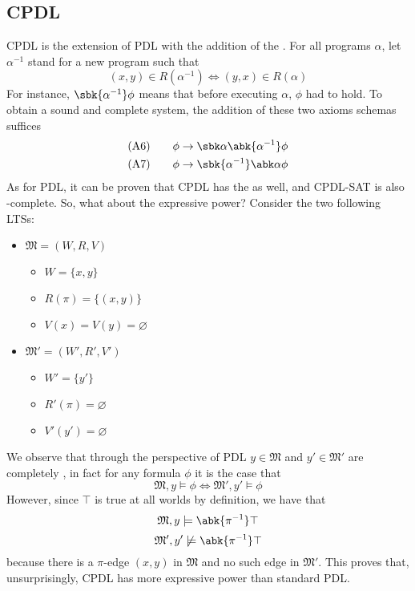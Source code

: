 \documentclass[a4paper, 12pt]{report}
\begin{document}
    \subsection{CPDL}

    CPDL is the extension of PDL with the addition of the . For all programs $\alpha$, let $\alpha^{-1}$ stand for a new program such that $$(x, y) \in R(\alpha^{-1}) \iff (y, x) \in R(\alpha)$$ For instance, $\sbk{\alpha ^{-1}}\phi$ means that before executing $\alpha$, $\phi$ had to hold. To obtain a sound and complete system, the addition of these two axioms schemas suffices
    \begin{equation*}
        \begin{alignedat}{2}
            (\mbox A 6) & \quad \quad && \phi \to \sbk \alpha \abk{\alpha^{-1}} \phi \\
            (\mbox A 7) & \quad \quad && \phi \to \sbk{\alpha ^{-1}} \abk \alpha \phi \\
        \end{alignedat}
    \end{equation*}
    As for PDL, it can be proven that CPDL has the  as well, and CPDL-SAT is also \EXP-complete. So, what about the expressive power? Consider the two following LTSs:
    
    \begin{itemize}
        \item $\mathfrak M = (W, R, V)$
            \begin{itemize}
                \item $W = \{x, y\}$
                \item $R(\pi) = \{(x, y)\}$
                \item $V(x) = V(y) = \varnothing$
            \end{itemize}
        \item $\mathfrak M' = (W', R', V')$
            \begin{itemize}
                \item $W'= \{y'\}$
                \item $R'(\pi) = \varnothing$
                \item $V'(y') = \varnothing$
            \end{itemize}
    \end{itemize}

    We observe that through the perspective of PDL $y \in \mathfrak M$ and $y' \in \mathfrak M'$ are completely , in fact for any formula $\phi$ it is the case that $$\mathfrak M, y \models \phi \iff \mathfrak M', y' \models \phi$$ However, since $\top$ is true at all worlds by definition, we have that $$\mathfrak M, y \models \abk{\pi^{-1}} \top$$ $$\mathfrak M', y' \not\models \abk{\pi^{-1}} \top$$ because there is a $\pi$-edge $(x, y)$ in $\mathfrak M$ and no such edge in $\mathfrak M'$. This proves that, unsurprisingly, CPDL has more expressive power than standard PDL.

\end{document}

